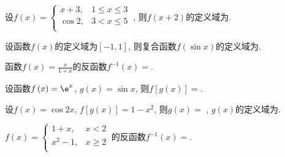 \begin{problem}
	设$f\left( x \right) = \left\{ \begin{matrix}
	x + 3,  & 1 \leq x \leq 3 \\
	\cos 2,  & 3 < x \leq 5 \\
	\end{matrix} \right.\ $, 则$f\left( x + 2 \right)$的定义域为.
\end{problem} 



\begin{problem}设函数$f\left( x \right)$的定义域为$\left\lbrack - 1,1 \right\rbrack$, 则复合函数$f\left( \sin x \right)$的定义域为\fillin{$\left( - \infty, + \infty \right)$}.
	
\end{problem} 


\begin{problem}函数$\displaystyle f\left( x \right) = \frac{x}{1 + x}$的反函数$f^{- 1}\left( x \right) =$.
\end{problem} 

\begin{problem}设函数$f\left( x \right) = \e^{x}$, $g\left( x \right) = \sin x$, 则$f\left\lbrack g\left( x \right) \right\rbrack =$.
\end{problem} 

\begin{problem}设$f\left( x \right) = \cos 2x$, $f\left\lbrack g\left( x \right) \right\rbrack = 1 - x^{2}$, 则$g\left( x \right) =$
	 , $g\left( x \right)$的定义域为.
\end{problem}

\begin{problem}$f\left( x \right) = \left\{ \begin{matrix}
	1 + x, & x < 2 \\
	x^{2} - 1, & x \geq 2 \\
	\end{matrix} \right.\ $的反函数$f^{- 1}\left( x \right) =$.
\end{problem} 


